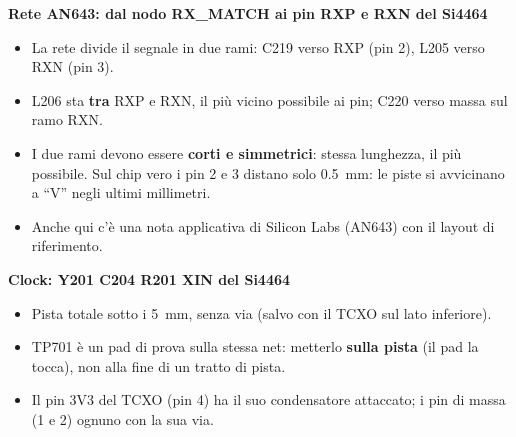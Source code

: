 \documentclass[a4paper,11pt]{article}
\newcommand{\blocco}[3]{%
  \par\medskip\noindent\begin{minipage}{\linewidth}
  {\sffamily\bfseries\color{sbblue}#1}\par\smallskip
  \centering\par\smallskip
  \raggedright\small #3
  \end{minipage}\par\medskip}
\begin{document}
\blocco{Rete AN643: dal nodo RX\_MATCH ai pin RXP e RXN del Si4464}{blk_an643}{%
\begin{itemize}[nosep]
\item La rete divide il segnale in due rami: C219 verso RXP (pin 2), L205 verso RXN (pin 3).
\item L206 sta \textbf{tra} RXP e RXN, il più vicino possibile ai pin; C220 verso massa sul ramo RXN.
\item I due rami devono essere \textbf{corti e simmetrici}: stessa lunghezza, il più possibile. Sul chip vero i pin 2 e 3 distano solo \SI{0.5}{mm}: le piste si avvicinano a \enquote{V} negli ultimi millimetri.
\item Anche qui c'è una nota applicativa di Silicon Labs (AN643) con il layout di riferimento.
\end{itemize}}

\blocco{Clock: Y201 \textrightarrow{} C204 \textrightarrow{} R201 \textrightarrow{} XIN del Si4464}{blk_tcxo}{%
\begin{itemize}[nosep]
\item Pista totale sotto i \SI{5}{mm}, senza via (salvo con il TCXO sul lato inferiore).
\item TP701 è un pad di prova sulla stessa net: metterlo \textbf{sulla pista} (il pad la tocca), non alla fine di un tratto di pista.
\item Il pin 3V3 del TCXO (pin 4) ha il suo condensatore attaccato; i pin di massa (1 e 2) ognuno con la sua via.
\end{itemize}}

\end{document}
